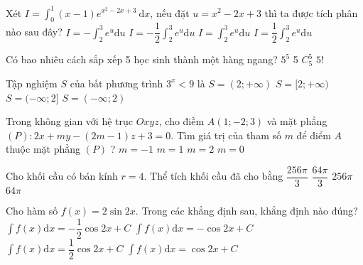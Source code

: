 \begin{ex} %
 Xét $I=\int_{0}^{1}(x-1) e^{x^{2}-2 x+3} \mathrm{~d} x$, nếu đặt $u=x^{2}-2 x+3$ thì ta được tích phân nào sau đây?
\choice
{$I=-\int_{2}^{3} e^{u} \mathrm{d} u$}
{\True $I=-\dfrac{1}{2} \int_{2}^{3} e^{u} \mathrm{d} u$}
{$I=\int_{2}^{3} e^{u} \mathrm{d} u$}
{$I=\dfrac{1}{2} \int_{2}^{3} e^{u} \mathrm{d} u$}
\end{ex}

\begin{ex} %
 Có bao nhiêu cách sắp xếp 5 học sinh thành một hàng ngang?
\choice
{$5^{5}$}
{5}
{$C_{5}^{5}$}
{\True $5!$}
\end{ex}

\begin{ex} %
 Tập nghiệm $S$ của bất phương trình $3^{x}<9$ là
\choice
{$S=(2;+\infty)$}
{$S=[2;+\infty)$}
{$S=(-\infty; 2]$}
{\True$S=(-\infty; 2)$}
\end{ex}

\begin{ex} %
\end{ex}

\begin{ex} %
 Trong không gian với hệ trục $O x y z$, cho điềm $A(1;-2; 3)$ và mặt phẳng $(P): 2 x+m y-(2 m-1) z+3=0$. Tìm giá trị của tham số $m$ để điểm $A$ thuộc mặt phẳng $(P)$ ?
\choice
{$m=-1$}
{\True$m=1$}
{$m=2$}
{$m=0$}
\end{ex}

\begin{ex} %
 Cho khối cầu có bán kính $r=4$. Thể tích khối cầu đã cho bằng
\choice
{$\dfrac{256 \pi}{3}$}
{\True$\dfrac{64 \pi}{3}$}
{$256 \pi$}
{$64 \pi$}
\end{ex}

\begin{ex} %
 Cho hàm số $f(x)=2 \sin 2 x$. Trong các khẳng định sau, khẳng định nào đúng?
\choice
{$\int f(x) \mathrm{d} x=-\dfrac{1}{2} \cos 2 x+C$}
{\True $\int f(x) \mathrm{d} x=-\cos 2 x+C$}
{$\int f(x) \mathrm{d} x=\dfrac{1}{2} \cos 2 x+C$}
{$\int f(x) \mathrm{d} x=\cos 2 x+C$}
\end{ex}

